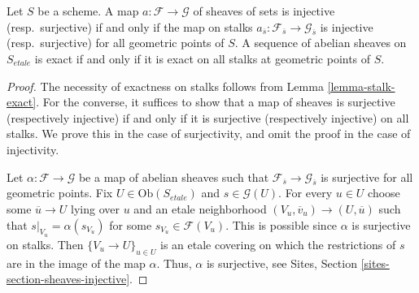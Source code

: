 \begin{theorem}
\label{theorem-exactness-stalks}
Let $S$ be a scheme.
A map $a : \mathcal{F} \to \mathcal{G}$ of sheaves of sets is injective
(resp.\ surjective) if and only if the map on stalks
$a_{\overline{s}} : \mathcal{F}_{\overline{s}} \to \mathcal{G}_{\overline{s}}$
is injective (resp.\ surjective) for all geometric points of $S$.
A sequence of abelian sheaves on $S_{etale}$ is exact
if and only if it is exact on all stalks at geometric points of $S$.
\end{theorem}

\begin{proof}
The necessity of exactness on stalks follows from
Lemma \ref{lemma-stalk-exact}.
For the converse, it suffices to show that a map of sheaves is surjective
(respectively injective) if and only if it is surjective (respectively
injective) on all stalks. We prove this in the case of surjectivity, and omit
the proof in the case of injectivity.

\medskip\noindent
Let $\alpha : \mathcal{F} \to \mathcal{G}$ be a map of abelian sheaves such
that $\mathcal{F}_{\overline{s}} \to \mathcal{G}_{\overline{s}}$
is surjective for all geometric points. Fix $U \in \text{Ob}(S_{etale})$
and $s \in \mathcal{G}(U)$. For every $u \in U$ choose some
$\overline{u} \to U$ lying over $u$ and an etale neighborhood
$(V_u , \overline{v}_u) \to (U, \overline{u})$ such that
$s|_{V_u} = \alpha(s_{V_u})$ for some
$s_{V_u} \in \mathcal{F}(V_u)$.
This is possible since $\alpha$ is surjective on
stalks. Then $\{V_u \to U\}_{u \in U}$
is an etale covering on which the restrictions of $s$
are in the image of the map $\alpha$.
Thus, $\alpha$ is surjective, see
Sites, Section \ref{sites-section-sheaves-injective}.
\end{proof}

